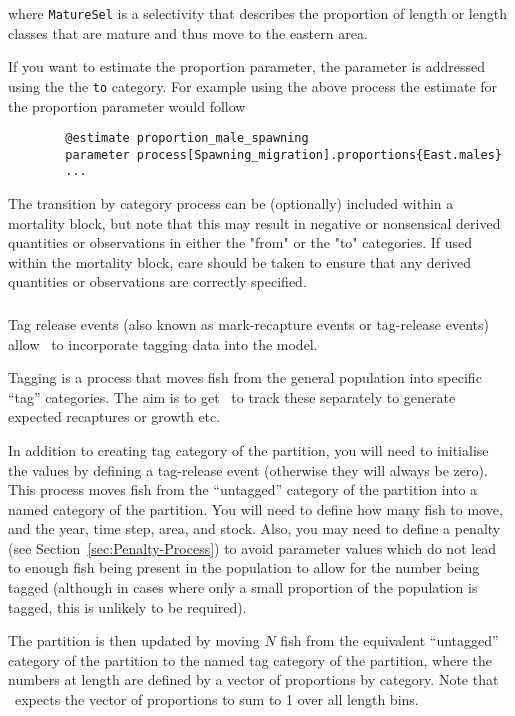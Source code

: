 where \texttt{MatureSel} is a selectivity that describes the proportion of length or length classes that are mature and thus move to the eastern area.

If you want to estimate the proportion parameter, the parameter is addressed using the the \texttt{to} category. For example using the above process the estimate for the proportion parameter would follow

{\small{\begin{verbatim}
		@estimate proportion_male_spawning
		parameter process[Spawning_migration].proportions{East.males}
		...
		\end{verbatim}}}

The transition by category process can be (optionally) included within a mortality block, but note that this may result in negative or nonsensical derived quantities or observations in either the "from" or the "to" categories. If used within the mortality block, care should be taken to ensure that any derived quantities or observations are correctly specified.

\subsubsection{}\label{sec:Process-Tagging}\label{sec:Process-TagByLength}

Tag release events (also known as mark-recapture events or tag-release events) allow \CNAME\ to incorporate tagging data into the model.

Tagging is a process that moves fish from the general population into specific \enquote{tag} categories. The aim is to get \CNAME\ to track these separately to generate expected recaptures or growth etc.

In addition to creating tag category of the partition, you will need to initialise the values by defining a tag-release event (otherwise they will always be zero). This process moves fish from the \enquote{untagged} category of the partition into a named category of the partition. You will need to define how many fish to move, and the year, time step, area, and stock. Also, you may need to define a penalty (see Section~\ref{sec:Penalty-Process}) to avoid parameter values which do not lead to enough fish being present in the population to allow for the number being tagged (although in cases where only a small proportion of the population is tagged, this is unlikely to be required).

The partition is then updated by moving \(N\) fish from the equivalent \enquote{untagged} category of the partition to the named tag category of the partition, where the numbers at length are defined by a vector of proportions by category. Note that \CNAME\ expects the vector of proportions to sum to 1 over all length bins.

